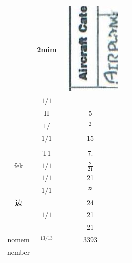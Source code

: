\documentclass[10pt]{article}
\begin{document}
\begin{center}
\begin{tabular}{|c|c|c|c|}
\hline
 & 2mim & \includegraphics[max width=\textwidth]{2025_02_27_dd68c3d38de88f0516d9g-052}
 &  \\
\hline
 & \(1 / 1\) &  &  \\
\hline
 & II & 5 &  \\
\hline
 & \(1 /\) & \({ }^{2}\) &  \\
\hline
 & \(1 / 1\) & 15 &  \\
\hline
 &  &  &  \\
\hline
 & T1 & 7. &  \\
\hline
fek & \(1 / 1\) & \(\frac{2}{21}\) &  \\
\hline
 & \(1 / 1\) & 21 &  \\
\hline
 & \(1 / 1\) & \({ }^{23}\) &  \\
\hline
边 &  & 24 &  \\
\hline
 & \(1 / 1\) & 21 &  \\
\hline
 &  & 21 &  \\
\hline
nomem & \({ }^{13 / 13}\) & 3393 &  \\
\hline
nember &  &  &  \\
\hline
\end{tabular}
\end{center}
\end{document}
